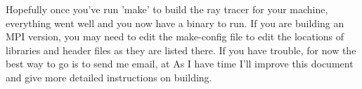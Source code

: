   Hopefully once you've run 'make' to build the ray tracer for your machine,
everything went well and you now have a binary to run.  If you are building
an MPI version, you may need to edit the make-config file to edit the 
locations of libraries and header files as they are listed there.
If you have trouble, for now the best way to go is to send me email, at
{\em \EMAIL}  As I have time I'll improve this document and give
more detailed instructions on building.  

